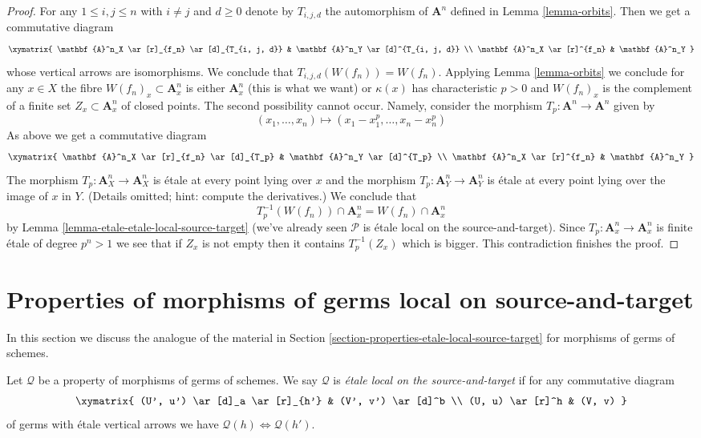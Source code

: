 \begin{proof}
\medskip\noindent
For any $1 \leq i, j \leq n$ with $i \not = j$ and $d \geq 0$
denote by $T_{i, j, d}$ the automorphism of $\mathbf{A}^n$ defined
in Lemma \ref{lemma-orbits}. Then we get a commutative diagram
$$
\xymatrix{
\mathbf{A}^n_X \ar[r]_{f_n} \ar[d]_{T_{i, j, d}} &
\mathbf{A}^n_Y \ar[d]^{T_{i, j, d}} \\
\mathbf{A}^n_X \ar[r]^{f_n} & \mathbf{A}^n_Y
}
$$
whose vertical arrows are isomorphisms. We conclude that
$T_{i, j, d}(W(f_n)) = W(f_n)$. Applying Lemma \ref{lemma-orbits}
we conclude for any $x \in X$ the fibre $W(f_n)_x \subset \mathbf{A}^n_x$ is
either $\mathbf{A}^n_x$ (this is what we want) or $\kappa(x)$
has characteristic $p > 0$ and $W(f_n)_x$
is the complement of a finite set $Z_x \subset \mathbf{A}^n_x$
of closed points. The second possibility cannot occur. Namely,
consider the morphism $T_p : \mathbf{A}^n \to \mathbf{A}^n$ given by
$$
(x_1, \ldots, x_n) \mapsto (x_1 - x_1^p, \ldots, x_n - x_n^p)
$$
As above we get a commutative diagram
$$
\xymatrix{
\mathbf{A}^n_X \ar[r]_{f_n} \ar[d]_{T_p} &
\mathbf{A}^n_Y \ar[d]^{T_p} \\
\mathbf{A}^n_X \ar[r]^{f_n} & \mathbf{A}^n_Y
}
$$
The morphism $T_p : \mathbf{A}^n_X \to \mathbf{A}^n_X$
is \'etale at every point lying over $x$
and the morphism $T_p : \mathbf{A}^n_Y \to \mathbf{A}^n_Y$
is \'etale at every point lying over the image of $x$ in $Y$.
(Details omitted; hint: compute the derivatives.)
We conclude that
$$
T_p^{-1}(W(f_n)) \cap \mathbf{A}^n_x = W(f_n) \cap \mathbf{A}^n_x
$$
by Lemma \ref{lemma-etale-etale-local-source-target}
(we've already seen $\mathcal{P}$ is
\'etale local on the source-and-target).
Since $T_p : \mathbf{A}^n_x \to \mathbf{A}^n_x$ is finite \'etale
of degree $p^n > 1$ we see that if $Z_x$ is not empty then it contains
$T_p^{-1}(Z_x)$ which is bigger. This contradiction finishes
the proof.
\end{proof}





\section{Properties of morphisms of germs local on source-and-target}
\label{section-local-source-target-at-point}

\noindent
In this section we discuss the analogue of the material in
Section \ref{section-properties-etale-local-source-target}
for morphisms of germs of schemes.

\begin{definition}
\label{definition-local-source-target-at-point}
Let $\mathcal{Q}$ be a property of morphisms of germs of schemes.
We say $\mathcal{Q}$ is  {\it \'etale local on the source-and-target}
if for any commutative diagram
$$
\xymatrix{
(U', u') \ar[d]_a \ar[r]_{h'} & (V', v') \ar[d]^b \\
(U, u) \ar[r]^h & (V, v)
}
$$
of germs with \'etale vertical arrows we have
$\mathcal{Q}(h) \Leftrightarrow \mathcal{Q}(h')$.
\end{definition}

